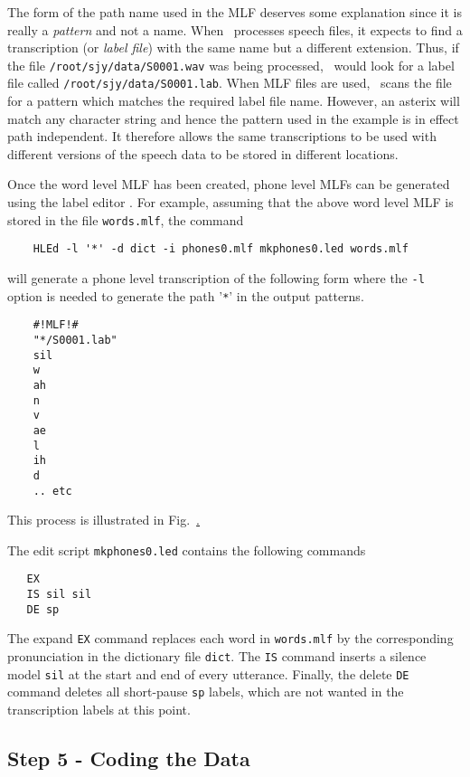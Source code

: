 The form of the path name used in the MLF deserves some explanation since it is
really a \textit{pattern} and not a name.
When \HTK\ processes speech files, it expects to find a transcription (or 
{\it label file}) with the same name but a different extension.  Thus, if the file
\texttt{/root/sjy/data/S0001.wav} was being processed, \HTK\ would look for a
label file called \texttt{/root/sjy/data/S0001.lab}.  When MLF files are used,
\HTK\ scans the file for a pattern which matches the required label file name.
However, an asterix will match any character string and hence the pattern used
in the example is in effect path independent.  It therefore allows the same
transcriptions to be used with different versions of the speech data to be
stored in different locations.

Once the word level MLF has been created, phone level MLFs can be generated
using the label editor . For example,
assuming that the above word level MLF is stored in the file
\texttt{words.mlf}, the command
\begin{verbatim}
    HLEd -l '*' -d dict -i phones0.mlf mkphones0.led words.mlf
\end{verbatim}
will generate a phone level transcription of the following form
where the \texttt{-l} option is needed to generate the path '\verb+*+' in the 
output patterns.
\begin{verbatim}
    #!MLF!#
    "*/S0001.lab"
    sil
    w
    ah
    n
    v
    ae
    l
    ih
    d
    .. etc
\end{verbatim}
This process is illustrated in Fig.~\href{f:step4}.

The  edit script \texttt{mkphones0.led} 
contains the following commands
\begin{verbatim}
   EX
   IS sil sil
   DE sp
\end{verbatim}
The expand \texttt{EX} command replaces each word in \texttt{words.mlf} 
by the corresponding pronunciation in the dictionary file \texttt{dict}.  
The \texttt{IS}
command inserts a silence model \texttt{sil} at the start and end of
every utterance.  Finally, the delete \texttt{DE} command deletes all
short-pause \texttt{sp} labels, which are not wanted in the transcription
labels at this point.  


\subsection{Step 5 - Coding the Data}

